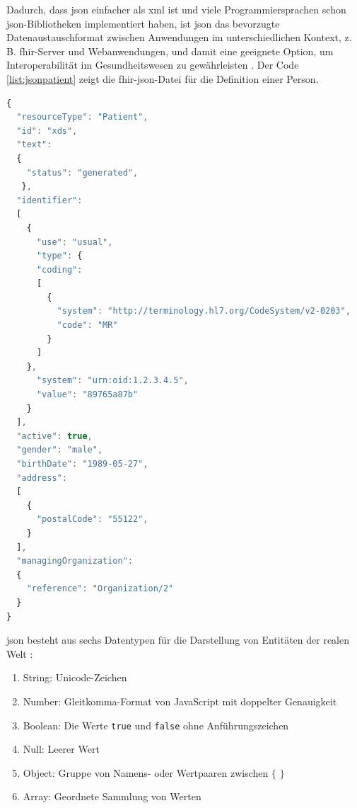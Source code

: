 Dadurch, dass \ac{json} einfacher als \ac{xml} ist und viele Programmiersprachen schon \ac{json}-Bibliotheken implementiert haben, ist \ac{json} das bevorzugte Datenaustauschformat zwischen Anwendungen im unterschiedlichen Kontext, z. B. \ac{fhir}-Server und Webanwendungen, und damit eine geeignete Option, um Interoperabilität im Gesundheitswesen zu gewährleisten \cite{interop, jsondef}. Der Code \ref{list:jsonpatient} zeigt die \ac{fhir}-\ac{json}-Datei für die Definition einer Person.

\begin{lstlisting}[caption={[Beispiel einer \acs{fhir}-Ressource in JSON] Beispiel einer \acs{fhir}-Ressource für eine Person in JSON.},language=JavaScript, label=list:jsonpatient, captionpos=b]
{
  "resourceType": "Patient",
  "id": "xds",
  "text": 
  {
    "status": "generated",
   },
  "identifier": 
  [
    {
      "use": "usual",
	  "type": {
	  "coding": 
	  [
	    {
	      "system": "http://terminology.hl7.org/CodeSystem/v2-0203",
	      "code": "MR"
	    }
	  ]
	},
	  "system": "urn:oid:1.2.3.4.5",
	  "value": "89765a87b"
	}
  ],
  "active": true,
  "gender": "male",
  "birthDate": "1989-05-27",
  "address": 
  [
    {	  
	  "postalCode": "55122",
	}
  ],
  "managingOrganization": 
  {
    "reference": "Organization/2"
  }
}
\end{lstlisting}

\ac{json} besteht aus sechs Datentypen für die Darstellung von Entitäten der realen Welt \cite{jsondef}:
\begin{enumerate}
	\item String: Unicode-Zeichen
	\item Number: Gleitkomma-Format von JavaScript mit doppelter Genauigkeit
	\item Boolean: Die Werte \texttt{true} und \texttt{false} ohne Anführungszeichen
	\item Null: Leerer Wert
	\item Object: Gruppe von Namens- oder Wertpaaren zwischen $\{$ $\}$
	\item Array: Geordnete Sammlung von Werten
\end{enumerate}